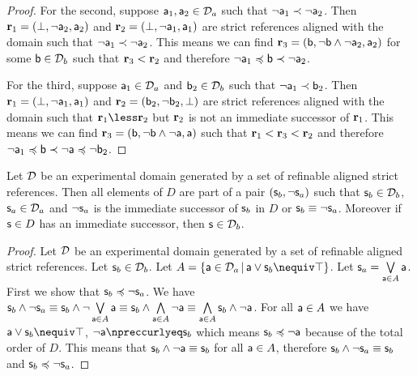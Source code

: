 \documentclass[11pt,letterpaper,fleqn]{memoir} %
\begin{document}
\begin{mathSection}
\begin{proof}
	For the second, suppose $\stmt[a]_1, \stmt[a]_2 \in \edomain_a$ such that $\NOT \stmt[a]_1 \snarrower \NOT \stmt[a]_2$. Then $\refStmt_1 = ( \impossibility, \NOT \stmt[a]_2, \stmt[a]_2 )$ and  $\refStmt_2 = ( \impossibility, \NOT \stmt[a]_1, \stmt[a]_1)$ are strict references aligned with the domain such that $\NOT \stmt[a]_1 \snarrower \NOT \stmt[a]_2$. This means we can find $\refStmt_3 = ( \stmt[b], \NOT \stmt[b] \AND \NOT \stmt[a]_2, \stmt[a]_2 )$ for some $\stmt[b] \in \edomain_b$ such that $\refStmt_3 < \refStmt_2$ and therefore $\NOT \stmt[a]_1 \narrower \stmt[b] \snarrower \NOT \stmt[a]_2$.
	
	For the third, suppose $\stmt[a]_1 \in \edomain_a$ and $\stmt[b]_2\in \edomain_b$ such that $\NOT \stmt[a]_1 \snarrower \stmt[b]_2$. Then $\refStmt_1 = ( \impossibility, \NOT \stmt[a]_1, \stmt[a]_1 )$ and  $\refStmt_2 = ( \stmt[b]_2, \NOT \stmt[b]_2, \impossibility)$ are strict references aligned with the domain such that $\refStmt_1 \less \refStmt_2$ but $\refStmt_2$ is not an immediate successor of $\refStmt_1$. This means we can find $\refStmt_3 = ( \stmt[b], \NOT \stmt[b] \AND \NOT \stmt[a], \stmt[a] )$ such that $\refStmt_1 < \refStmt_3 < \refStmt_2$ and therefore $\NOT \stmt[a]_1 \narrower \stmt[b] \snarrower \NOT \stmt[a] \narrower \NOT \stmt[b]_2$.
\end{proof}

\begin{prop}\label{3_prop_refinable_is_pair_ordering}
	Let $\edomain$ be an experimental domain generated by a set of refinable aligned strict references. Then all elements of $D$ are part of a pair $(\stmt_b, \NOT \stmt_a)$ such that $\stmt_b \in \edomain_b$, $\stmt_a \in \edomain_a$ and $\NOT \stmt_a$ is the immediate successor of $\stmt_b$ in $D$ or $\stmt_b \equiv \NOT \stmt_a$. Moreover if $\stmt \in D$ has an immediate successor, then $\stmt \in \edomain_b$.
\end{prop}
\begin{proof}
	Let $\edomain$ be an experimental domain generated by a set of refinable aligned strict references. Let $\stmt_b \in \edomain_b$. Let $A=\{\stmt[a] \in \edomain_a \, | \, \stmt[a] \OR \stmt_b \nequiv \certainty \}$. Let $\stmt_a=\bigOR\limits_{\stmt[a] \in A} \stmt[a]$. First we show that $\stmt_b \narrower \NOT \stmt_a$. We have $\stmt_b \AND \NOT \stmt_a \equiv \stmt_b \AND \NOT \bigOR\limits_{\stmt[a] \in A} \stmt[a] \equiv \stmt_b \AND \bigAND\limits_{\stmt[a] \in A} \NOT \stmt[a] \equiv \bigAND\limits_{\stmt[a] \in A} \stmt_b \AND \NOT \stmt[a]$. For all $\stmt[a] \in A$ we have $\stmt[a] \OR \stmt_b \nequiv \certainty$, $\NOT \stmt[a] \nnarrower \stmt_b$ which means $\stmt_b \narrower \NOT \stmt[a]$ because of the total order of $D$. This means that $\stmt_b \AND \NOT \stmt[a] \equiv \stmt_b$ for all $\stmt[a] \in A$, therefore $\stmt_b \AND \NOT \stmt_a \equiv \stmt_b$ and $\stmt_b \narrower \NOT \stmt_a$.
	

\end{proof}
\end{mathSection}
\end{document}

